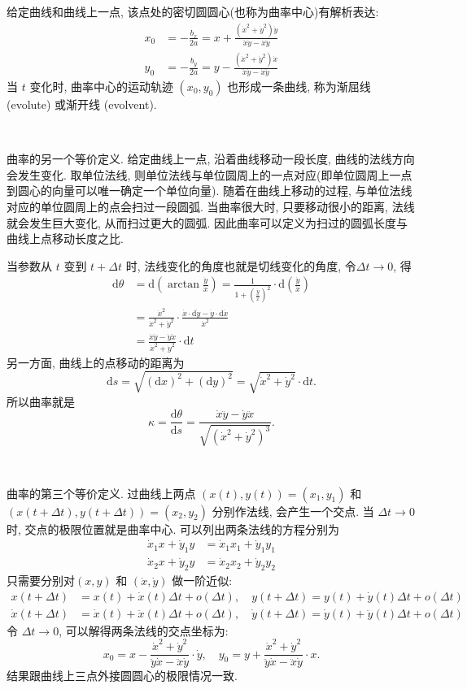 给定曲线和曲线上一点, 该点处的密切圆圆心(也称为曲率中心)有解析表达:
\begin{align*}
x_0 &= -\frac{b_x}{2a} = x + \frac{(\dot{x}^2+\dot{y}^2)\dot{y}}{\ddot{x}\dot{y}-\dot{x}\ddot{y}} \\
y_0 &= -\frac{b_y}{2a} = y - \frac{(\dot{x}^2+\dot{y}^2)\dot{x}}{\ddot{x}\dot{y}-\dot{x}\ddot{y}}
\end{align*}
当 $t$ 变化时, 曲率中心的运动轨迹 $(x_0,y_0)$ 也形成一条曲线, 称为渐屈线 (evolute) 或渐开线 (evolvent). 

~

曲率的另一个等价定义. 给定曲线上一点, 沿着曲线移动一段长度, 曲线的法线方向会发生变化. 取单位法线, 则单位法线与单位圆周上的一点对应(即单位圆周上一点到圆心的向量可以唯一确定一个单位向量). 随着在曲线上移动的过程, 与单位法线对应的单位圆周上的点会扫过一段圆弧. 当曲率很大时, 只要移动很小的距离, 法线就会发生巨大变化, 从而扫过更大的圆弧. 因此曲率可以定义为扫过的圆弧长度与曲线上点移动长度之比.

当参数从 $t$ 变到 $t+\Delta t$ 时, 法线变化的角度也就是切线变化的角度, 令$\Delta t\to 0$, 得
\begin{align*}
\mathrm{d}\theta &= \mathrm{d}\left(\arctan\frac{\dot{y}}{\dot{x}}\right) = \frac{1}{1+(\frac{\dot{y}}{\dot{x}})^2}\cdot\mathrm{d}\left(\frac{\dot{y}}{\dot{x}}\right)\\
&= \frac{\dot{x}^2}{\dot{x}^2+\dot{y}^2}\cdot\frac{\dot{x}\cdot\mathrm{d}\dot{y} - \dot{y}\cdot\mathrm{d}\dot{x}}{\dot{x}^2}\\
&= \frac{\dot{x}\ddot{y}-\dot{y}\ddot{x}}{\dot{x}^2+\dot{y}^2}\cdot\mathrm{d}t
\end{align*}
另一方面, 曲线上的点移动的距离为 
\[ \mathrm{d}s = \sqrt{(\mathrm{d}x)^2 + (\mathrm{d}y)^2} = \sqrt{\dot{x}^2+\dot{y}^2}\cdot\mathrm{d}t .\]
所以曲率就是
\[\kappa = \frac{\mathrm{d}\theta}{\mathrm{d}s} = \frac{\dot{x}\ddot{y}-\dot{y}\ddot{x}}{\sqrt{(\dot{x}^2+\dot{y}^2)^3}} .\]

~

曲率的第三个等价定义. 过曲线上两点 $(x(t),y(t)) = (x_1,y_1)$ 和 $(x(t+\Delta t), y(t+\Delta t)) = (x_2,y_2)$ 分别作法线, 会产生一个交点. 当 $\Delta t\to 0$ 时, 交点的极限位置就是曲率中心. 可以列出两条法线的方程分别为
\begin{align*}
\dot{x}_1 x + \dot{y}_1 y &= \dot{x}_1 x_1 + \dot{y}_1 y_1 \\
\dot{x}_2 x + \dot{y}_2 y &= \dot{x}_2 x_2 + \dot{y}_2 y_2 
\end{align*}
只需要分别对$(x,y)$ 和 $(\dot{x},\dot{y})$ 做一阶近似:
\begin{align*}
x(t+\Delta t) &= x(t) + \dot{x}(t)\Delta t + o(\Delta t), \quad y(t+\Delta t) = y(t) + \dot{y}(t)\Delta t + o(\Delta t)\\
\dot{x}(t+\Delta t) &= \dot{x}(t) + \ddot{x}(t)\Delta t + o(\Delta t), \quad \dot{y}(t+\Delta t) = \dot{y}(t) + \ddot{y}(t)\Delta t + o(\Delta t)
\end{align*}
令 $\Delta t \to 0$, 可以解得两条法线的交点坐标为:
\[ x_0 = x - \frac{\dot{x}^2+\dot{y}^2}{\ddot{y}\dot{x}-\ddot{x}\dot{y}}\cdot\dot{y}, \quad y_0 = y + \frac{\dot{x}^2+\dot{y}^2}{\ddot{y}\dot{x}-\ddot{x}\dot{y}}\cdot{x} .\]
结果跟曲线上三点外接圆圆心的极限情况一致.


